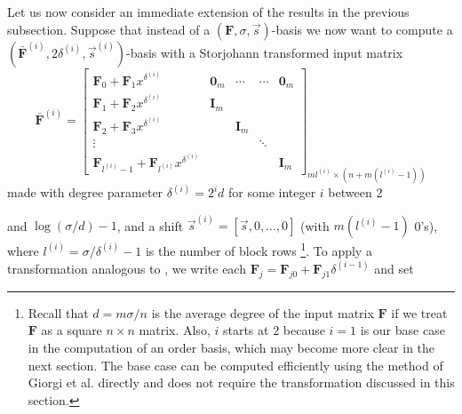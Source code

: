 Let us now consider an immediate extension of the results in the previous
subsection. Suppose that instead of a $\left(\mathbf{F},\sigma,\vec{s}\right)$-basis
we now want to compute a $(\bar{\mathbf{F}}^{\left(i\right)},2\delta^{\left(i\right)},\vec{s}^{\left(i\right)})$-basis
with a Storjohann transformed input matrix 
\[
\bar{\mathbf{F}}^{\left(i\right)}=\left[\begin{array}{c|cccc}
\mathbf{F}_{0}+\mathbf{F}_{1}x^{\delta^{\left(i\right)}} & \mathbf{0}_{m} & \cdots & \mathbf{\cdots} & \mathbf{0}_{m}\\
\hline \mathbf{F}_{1}+\mathbf{F}_{2}x^{\delta^{\left(i\right)}} & \mathbf{I}_{m}\\
\mathbf{F}_{2}+\mathbf{F}_{3}x^{\delta^{\left(i\right)}} &  & \mathbf{I}_{m}\\
\vdots &  &  & \ddots\\
\mathbf{F}_{l^{\left(i\right)}-1}+\mathbf{F}_{l^{\left(i\right)}}x^{\delta^{\left(i\right)}} &  &  &  & \mathbf{I}_{m}
\end{array}\right]_{ml^{(i)}\times(n+m(l^{(i)}-1))}
\]
 made with degree parameter $\delta^{\left(i\right)}=2^{i}d$ for
some integer $i$ between $2$%
\begin{comment}
the base case is $i=1$ and problem is not to be subdivided 
\end{comment}
{} and $\log\left(\sigma/d\right)-1$, and a shift $\vec{s}^{\left(i\right)}=[\vec{s},0,\dots,0]$
(with $m(l^{\left(i\right)}-1)$ 0's), where $l^{\left(i\right)}=\sigma/\delta^{\left(i\right)}-1$
is the number of block rows%
\footnote{Recall that $d=m\sigma/n$ is the average degree of the input matrix
$\mathbf{F}$ if we treat $\mathbf{F}$ as a square $n\times n$ matrix.
Also, $i$ starts at $2$ because $i=1$ is our base case in the computation
of an order basis, which may become more clear in the next section.
The base case can be computed efficiently using the method of Giorgi
et al. \citeyearpar{Giorgi2003} directly and does not require the
transformation discussed in this section.%
}. To apply a transformation analogous to ,
we write each $\mathbf{F}_{j}=\mathbf{F}_{j0}+\mathbf{F}_{j1}\delta^{\left(i-1\right)}$
and set 
